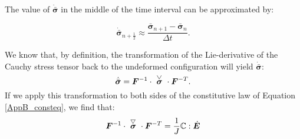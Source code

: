 {{The value of $\dot{\bar{\boldsymbol{\sigma}}}$ in the middle of the time interval can be approximated by:
{\begin{equation}
\dot{\bar{\boldsymbol{\sigma}}}_{n+\frac{1}{2}}\approx\frac{\bar{\boldsymbol{\sigma}}_{n+1}-\bar{\boldsymbol{\sigma}}_{n}}{\Delta t}.
\end{equation}

We know that, by definition, the transformation of the Lie-derivative of the Cauchy stress tensor back to the undeformed configuration will yield $\dot{\bar{\boldsymbol{\sigma}}}$:
\begin{equation}
 \dot{\bar{\boldsymbol{\sigma}}}=\boldsymbol{F}^{-1}\cdot\acctriang{\boldsymbol{\sigma}}\cdot\boldsymbol{F}^{-T}.
\end{equation}
If we apply this transformation to both sides of the constitutive law of Equation \ref{AppB_consteq}, we find that:
\begin{equation}
\boldsymbol{F}^{-1}\cdot\acctriang{\boldsymbol{\sigma}}\cdot\boldsymbol{F}^{-T} = \frac{1}{J}\boldsymbol{\mathbb C}:\dot{\boldsymbol{E}}
\end{equation}



}}}
